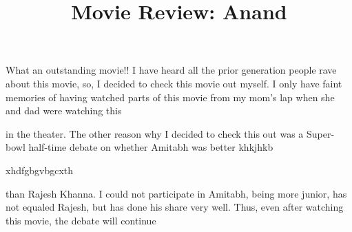 \documentclass[12pt, a4paper]{article}
\title{Movie Review: Anand}
\author{}
\date{}
\begin{document}
\maketitle
What an outstanding movie!! I have heard all the prior generation people rave about this movie, so, I decided to check this movie out myself. I only have faint memories of having watched parts of this movie from my mom's lap when she and dad were watching this

in the theater. The other reason why I decided to check this out was a Super-bowl half-time debate on whether Amitabh was better
khkjhkb

xhdfgbgvbgcxth

than Rajesh Khanna. I could not participate in  Amitabh, being more junior, has not equaled Rajesh, but has done his share very well. Thus, even after watching this movie, the debate will continue \par
\end{document}
